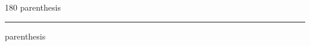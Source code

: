 
\begin{frame}
\begin{center}
\begin{turn}{180}
{\fontsize{2.5cm}{1em}\selectfont parenthesis}
\end{turn}
\vspace{1em}\par  
\hrule
\vspace{1em}\par  
{\fontsize{2.5cm}{1em}\selectfont parenthesis}
\end{center}
\end{frame}
